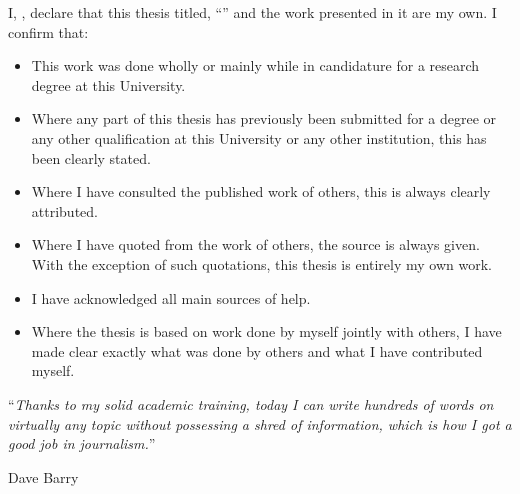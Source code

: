 \documentclass[
	11pt, %
english, %
singlespacing, %
headsepline, %
]{MastersDoctoralThesis} %
\begin{document}

\begin{declaration}
	\addchaptertocentry{\authorshipname} %
	\noindent I, \authorname, declare that this thesis titled, \enquote{\ttitle} and the work presented in it are my own. I confirm that:

	\begin{itemize}
		\item This work was done wholly or mainly while in candidature for a research degree at this University.
		\item Where any part of this thesis has previously been submitted for a degree or any other qualification at this University or any other institution, this has been clearly stated.
		\item Where I have consulted the published work of others, this is always clearly attributed.
		\item Where I have quoted from the work of others, the source is always given. With the exception of such quotations, this thesis is entirely my own work.
		\item I have acknowledged all main sources of help.
		\item Where the thesis is based on work done by myself jointly with others, I have made clear exactly what was done by others and what I have contributed myself.\\
	\end{itemize}

\end{declaration}

\cleardoublepage


\vspace*{0.2\textheight}

\noindent\enquote{\itshape Thanks to my solid academic training, today I can write hundreds of words on virtually any topic without possessing a shred of information, which is how I got a good job in journalism.}\bigbreak

\hfill Dave Barry

\end{document}
